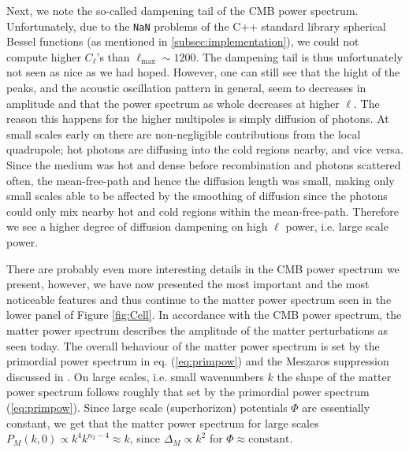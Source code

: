 \documentclass[twocolumn]{aastex62}
\begin{document}
Next, we note the so-called dampening tail of the CMB power spectrum. Unfortunately, due to the \texttt{NaN} problems of the C++ standard library spherical Bessel functions (as mentioned in \ref{subsec:implementation}), we could not compute higher $C_\ell$'s than $\ell_\text{max} \sim 1200$. The dampening tail is thus unfortunately not seen as nice as we had hoped. However, one can still see that the hight of the peaks, and the acoustic oscillation pattern in general, seem to decreases in amplitude and that the power spectrum as whole decreases at higher $\ell$. The reason this happens for the higher multipoles is simply diffusion of photons. At small scales early on there are non-negligible contributions from the local quadrupole; hot photons are diffusing into the cold regions nearby, and vice versa. Since the medium was hot and dense before recombination and photons scattered often, the mean-free-path and hence the diffusion length was small, making only small scales able to be affected by the smoothing of diffusion since the photons could only mix nearby hot and cold regions within the mean-free-path. Therefore we see a higher degree of diffusion dampening on high $\ell$ power, i.e. large scale power.

There are probably even more interesting details in the CMB power spectrum we present, however, we have now presented the most important and the most noticeable features and thus continue to the matter power spectrum seen in the lower panel of Figure \ref{fig:Cell}. In accordance with the CMB power spectrum, the matter power spectrum describes the amplitude of the matter perturbations as seen today. The overall behaviour of the matter power spectrum is set by the primordial power spectrum in eq. (\ref{eq:primpow}) and the Meszaros suppression discussed in \cite{stutzer:2020c}.
On large scales, i.e. small wavenumbers $k$ the shape of the matter power spectrum follows roughly that set by the primordial power spectrum (\ref{eq:primpow}). Since large scale (superhorizon) potentials $\Phi$ are essentially constant, we get that the matter power spectrum for large scales $P_M(k, 0) \propto k^4 k^{n_2 - 4} \approx k$, since $\Delta_M \propto k^2$ for $\Phi \approx \text{constant}$.
\end{document}
